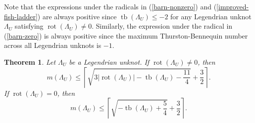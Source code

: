 \documentclass{article}
\DeclareMathOperator{\tb}{tb}
\DeclareMathOperator{\rot}{rot}
\newtheorem{theorem}{Theorem}
\begin{document}
Note that the expressions under the radicals in (\ref{barn-nonzero}) and (\ref{improved-fish-ladder}) are always positive since $\tb(\Lambda_U)\leq -2$ for any Legendrian unknot $\Lambda_U$ satisfying $\rot(\Lambda_U)\neq 0$. Similarly, the expression under the radical in (\ref{barn-zero}) is always positive since the maximum Thurston-Bennequin number across all Legendrian unknots is $-1$.

\begin{theorem} \label{fish-bound}
   Let $\Lambda_U$ be a Legendrian unknot. If  $\rot(\Lambda_U)\neq 0$, then
    \begin{equation}
        \label{barn-nonzero}
        m(\Lambda_U) \leq \left\lceil \sqrt{3|\rot(\Lambda_U)|-\tb(\Lambda_U)-\frac{11}{4}} + \frac{3}{2} \right\rceil.
    \end{equation}
    If  $\rot(\Lambda_U)=0$, then
    \begin{equation}
        \label{barn-zero}
        m(\Lambda_U)\leq \left\lceil \sqrt{-\tb(\Lambda_U)+\frac{5}{4}} + \frac{3}{2} \right\rceil.
    \end{equation}
\end{theorem}
\end{document}
